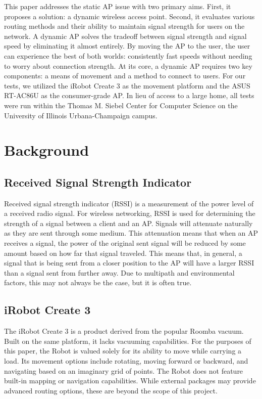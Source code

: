 This paper addresses the static AP issue with two primary aims. First, it proposes a solution: a dynamic wireless access point. Second, it evaluates various routing methods and their ability to maintain signal strength for users on the network. A dynamic AP solves the tradeoff between signal strength and signal speed by eliminating it almost entirely. By moving the AP to the user, the user can experience the best of both worlds: consistently fast speeds without needing to worry about connection strength. At its core, a dynamic AP requires two key components: a means of movement and a method to connect to users. For our tests, we utilized the iRobot Create 3 as the movement platform and the ASUS RT-AC86U as the consumer-grade AP. In lieu of access to a large home, all tests were run within the Thomas M. Siebel Center for Computer Science on the University of Illinois Urbana-Champaign campus. 

\section{Background}
\subsection{Received Signal Strength Indicator}
Received signal strength indicator (RSSI) is a measurement of the power level of a received radio signal. For wireless networking, RSSI is used for determining the strength of a signal between a client and an AP. Signals will attenuate naturally as they are sent through some medium. This attenuation means that when an AP receives a signal, the power of the original sent signal will be reduced by some amount based on how far that signal traveled. This means that, in general, a signal that is being sent from a closer position to the AP will have a larger RSSI than a signal sent from further away. Due to multipath and environmental factors, this may not always be the case, but it is often true.

\subsection{iRobot Create 3}
The iRobot Create 3 is a product derived from the popular Roomba vacuum. Built on the same platform, it lacks vacuuming capabilities. For the purposes of this paper, the Robot is valued solely for its ability to move while carrying a load. Its movement options include rotating, moving forward or backward, and navigating based on an imaginary grid of points. The Robot does not feature built-in mapping or navigation capabilities. While external packages may provide advanced routing options, these are beyond the scope of this project.

